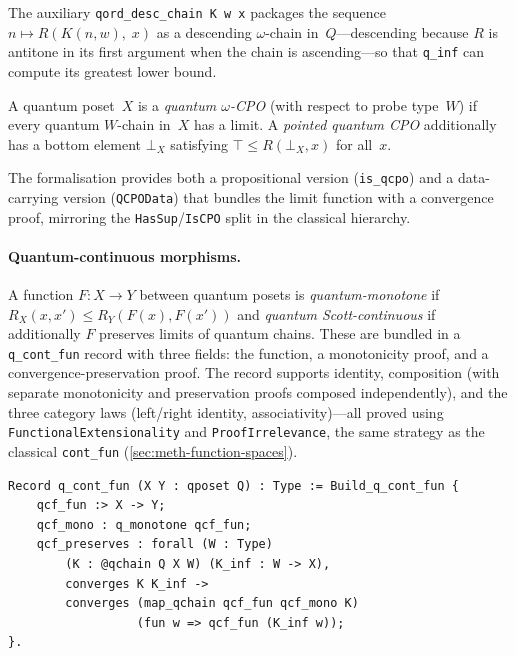\noindent
The auxiliary \texttt{qord\_desc\_chain K w x} packages the
sequence $n \mapsto R(K(n, w),\; x)$ as a descending $\omega$-chain
in~$Q$---descending because $R$ is antitone in its first argument
when the chain is ascending---so that \texttt{q\_inf} can compute
its greatest lower bound.

\begin{definition}
\label{def:qcpo}
A quantum poset~$X$ is a \emph{quantum $\omega$-CPO}
(with respect to probe type~$W$)
if every quantum $W$-chain in~$X$ has a limit.
A \emph{pointed quantum CPO} additionally has a bottom element
$\bot_X$ satisfying $\top \leq R(\bot_X, x)$ for all~$x$.
\end{definition}

\noindent
The formalisation provides both a propositional version
(\texttt{is\_qcpo}) and a data-carrying version (\texttt{QCPOData})
that bundles the limit function with a convergence proof, mirroring
the \texttt{HasSup}/\texttt{IsCPO} split in the classical hierarchy.

\paragraph{Quantum-continuous morphisms.}
A function $F : X \to Y$ between quantum posets is
\emph{quantum-monotone} if
$R_X(x, x') \leq R_Y(F(x), F(x'))$
and \emph{quantum Scott-continuous} if additionally
$F$ preserves limits of quantum chains.
These are bundled in a \texttt{q\_cont\_fun} record with three
fields: the function, a monotonicity proof, and a
convergence-preservation proof.
The record supports identity, composition (with separate
monotonicity and preservation proofs composed independently), and
the three category laws (left/right identity, associativity)---all
proved using \texttt{FunctionalExtensionality} and
\texttt{ProofIrrelevance}, the same strategy as the classical
\texttt{cont\_fun} (\cref{sec:meth-function-spaces}).

\begin{lstlisting}[caption={Bundled quantum Scott-continuous maps
  (\texttt{qCPOProperties.v}).},
                    label={lst:qcontfun}]
Record q_cont_fun (X Y : qposet Q) : Type := Build_q_cont_fun {
    qcf_fun :> X -> Y;
    qcf_mono : q_monotone qcf_fun;
    qcf_preserves : forall (W : Type)
        (K : @qchain Q X W) (K_inf : W -> X),
        converges K K_inf ->
        converges (map_qchain qcf_fun qcf_mono K)
                  (fun w => qcf_fun (K_inf w));
}.
\end{lstlisting}

